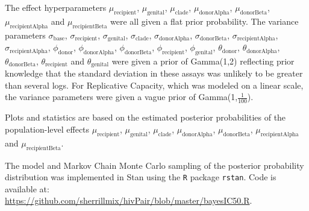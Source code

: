 \documentclass[12pt]{article}
\begin{document}
The effect hyperparameters
$\mu_{\text{recipient}}$, $\mu_{\text{genital}}$, $\mu_{\text{clade}}$, $\mu_{\text{donorAlpha}}$, $\mu_{\text{donorBeta}}$, $\mu_{\text{recipientAlpha}}$ and $\mu_{\text{recipientBeta}}$ were all given a flat prior probability.
The variance parameters 
$\sigma_{\text{base}}$, $\sigma_{\text{recipient}}$, $\sigma_{\text{genital}}$, $\sigma_{\text{clade}}$, $\sigma_{\text{donorAlpha}}$, $\sigma_{\text{donorBeta}}$, $\sigma_{\text{recipientAlpha}}$, $\sigma_{\text{recipientAlpha}}$,
$\phi_{\text{donor}}$, $\phi_{\text{donorAlpha}}$, $\phi_{\text{donorBeta}}$, $\phi_{\text{recipient}}$, $\phi_{\text{genital}}$,
$\theta_{\text{donor}}$, $\theta_{\text{donorAlpha}}$, $\theta_{\text{donorBeta}}$, $\theta_{\text{recipient}}$ and $\theta_{\text{genital}}$ 
were given a prior of Gamma(1,2) reflecting prior knowledge that the standard deviation in these assays was unlikely to be greater than several logs. For Replicative Capacity, which was modeled on a linear scale, the variance parameters were given a vague prior of Gamma(1,$\frac{1}{100}$).

Plots and statistics are based on the estimated posterior probabilities of the population-level effects $\mu_{\text{recipient}}$, $\mu_{\text{genital}}$, $\mu_{\text{clade}}$, $\mu_{\text{donorAlpha}}$, $\mu_{\text{donorBeta}}$, $\mu_{\text{recipientAlpha}}$ and $\mu_{\text{recipientBeta}}$.

The model and Markov Chain Monte Carlo sampling of the posterior probability distribution was implemented in Stan using the \texttt{R} package \texttt{rstan}. Code is available at:\\
\url{https://github.com/sherrillmix/hivPair/blob/master/bayesIC50.R}.
\end{document}
